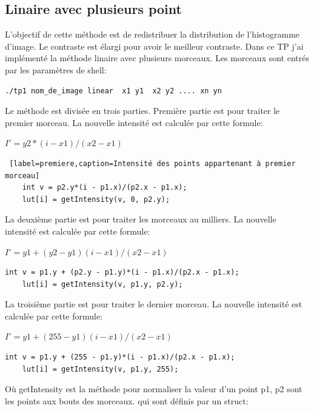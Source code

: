 \documentclass[paper=a4, fontsize=11pt]{scrartcl}	%
\begin{document}
\subsection{Linaire avec plusieurs point}
L'objectif de cette méthode est de redistribuer la distribution de l'histogramme d'image. Le contraste est élargi pour avoir le meilleur contraste.
Dans ce TP j'ai implémenté la méthode linaire avec plusieurs morceaux. Les morceaux sont entrés par les paramètres de shell:
\begin{lstlisting}[label=command,caption=commande pour traitement linaire de contraste]
./tp1 nom_de_image linear  x1 y1  x2 y2 .... xn yn
\end{lstlisting}
Le méthode est divisée en trois parties. Première partie est pour traiter le premier morceau.
La nouvelle intensité est calculée par cette formule:
\begin{center}
$I'=y2*(i - x1)/(x2 - x1)$
\end{center}
\begin{lstlisting} [label=premiere,caption=Intensité des points appartenant à premier morceau]
    int v = p2.y*(i - p1.x)/(p2.x - p1.x);
    lut[i] = getIntensity(v, 0, p2.y);
\end{lstlisting}

La deuxième partie est pour traiter les morceaux au milliers. La nouvelle intensité est calculée par cette formule:
\begin{center}
$I'=y1 + (y2 - y1)(i - x1)/(x2 - x1)$
\end{center}
\begin{lstlisting}[label=command,caption=commande pour traitement linaire de contraste]
    int v = p1.y + (p2.y - p1.y)*(i - p1.x)/(p2.x - p1.x);
    lut[i] = getIntensity(v, p1.y, p2.y);
\end{lstlisting}

La troisième partie est pour traiter le dernier morceau. La nouvelle intensité est calculée par cette formule:
\begin{center}
$I'=y1 + (255 - y1)(i - x1)/(x2 - x1)$
\end{center}

\begin{lstlisting}[label=command,caption=commande pour traitement linaire de contraste]
    int v = p1.y + (255 - p1.y)*(i - p1.x)/(p2.x - p1.x);
    lut[i] = getIntensity(v, p1.y, 255); 
\end{lstlisting}
Où getIntensity est la méthode pour normaliser la valeur d'un point p1, p2 sont les points aux bouts des morceaux. qui sont définis par un struct:
\end{document}

